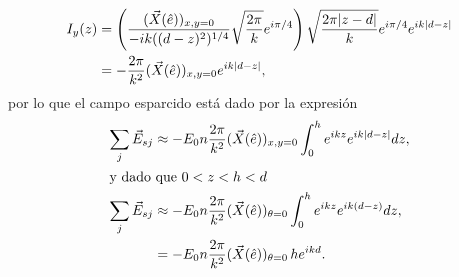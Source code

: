 \begin{align}
I_y (z) &= \left( \frac{(\vec{X}(\hat{e}))_{x,y=0} }{-ik ((d-z)^2)^{1/4}} \sqrt{\frac{2\pi}{k}} e^{i\pi/4} \right) \sqrt{\frac{2\pi |z-d|}{k}}e^{i\pi/4}e^{ik|d-z|}  \notag \\
	&= - \frac{2\pi}{k^2} (\vec{X}(\hat{e}))_{x,y=0} e^{ik|d-z|}, \label{eq:Iy}
\end{align}
por lo que el campo esparcido está dado por la expresión
\begin{align}
\sum_j \vec{E}_{sj} &\approx - E_0 n  \frac{2\pi}{k^2} (\vec{X}(\hat{e}))_{x,y=0}
					\int_0^h e^{ikz}  e^{ik|d-z|} dz,\\
\intertext{y dado que $0<z<h<d$}				
\sum_j \vec{E}_{sj} &\approx - E_0 n  \frac{2\pi}{k^2} (\vec{X}
					(\hat{e}))_{\theta=0} \int_0^h e^{ikz}  e^{ik(d-z)} dz,\\	
					&= - E_0 n  \frac{2\pi}{k^2} (\vec{X}
					(\hat{e}))_{\theta=0} \,h e^{ikd}.\label{eq:Es_delante}
\end{align}

